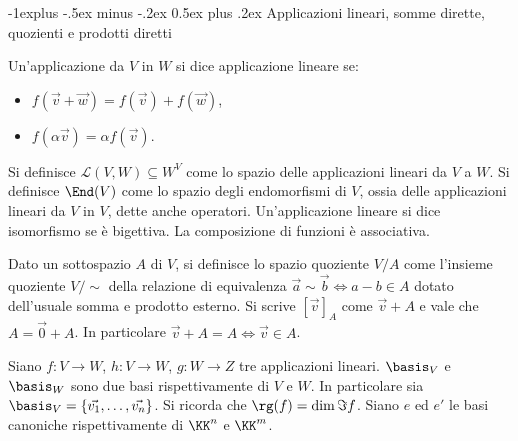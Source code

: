 \documentclass[10pt,landscape]{article}
\makeatletter
\renewcommand{\subsection}{\@startsection{subsection}{2}{0mm}%
	{-1explus -.5ex minus -.2ex}%
	{0.5ex plus .2ex}%
	{\normalfont\normalsize\bfseries}}
\makeatother
\begin{document}
\begin{multicols}{3}
\begin{itemize}
		\end{itemize}
		
		\subsection{Applicazioni lineari, somme dirette, quozienti e
			prodotti diretti}
		
		Un'applicazione da $V$ in $W$ si dice applicazione lineare
		se:
		
		\begin{itemize}
			\item $f(\vec{v} + \vec{w}) = f(\vec{v}) + f(\vec{w})$,
			\item $f(\alpha\vec{v}) = \alpha f(\vec{v})$.
		\end{itemize}
		
		Si definisce $\mathcal{L}(V, W) \subseteq W^V$ come lo spazio delle
		applicazioni lineari da $V$ a $W$. Si definisce
		$\End(V)$ come lo spazio degli endomorfismi di $V$, ossia
		delle applicazioni lineari da $V$ in $V$, dette anche
		operatori. Un'applicazione lineare si dice isomorfismo
		se è bigettiva. La composizione di funzioni è associativa.
		
		Dato un sottospazio $A$ di $V$, si definisce lo spazio
		quoziente $V/A$ come l'insieme quoziente $V/{\sim}$ della relazione
		di equivalenza $\vec{a} \sim \vec{b} \iff a-b \in A$ dotato
		dell'usuale somma e prodotto esterno. Si scrive $[\vec{v}]_A$
		come $\vec{v} + A$ e vale che $A = \vec{0} + A$. In particolare
		$\vec{v} + A = A \iff \vec{v} \in A$.
		
		Siano $f : V \to W$, $h : V \to W$, $g : W \to Z$ tre
		applicazioni lineari.
		$\basis_V$ e $\basis_W$ sono
		due basi rispettivamente di $V$ e $W$. In particolare
		sia $\basis_V = \{\vec{v_1}, \ldots, \vec{v_n}\}$. Si
		ricorda che $\rg(f) = \dim \Im f$. Siano $e$ ed $e'$ le
		basi canoniche rispettivamente di $\KK^n$ e $\KK^m$.
		

\end{multicols}
\end{document}
